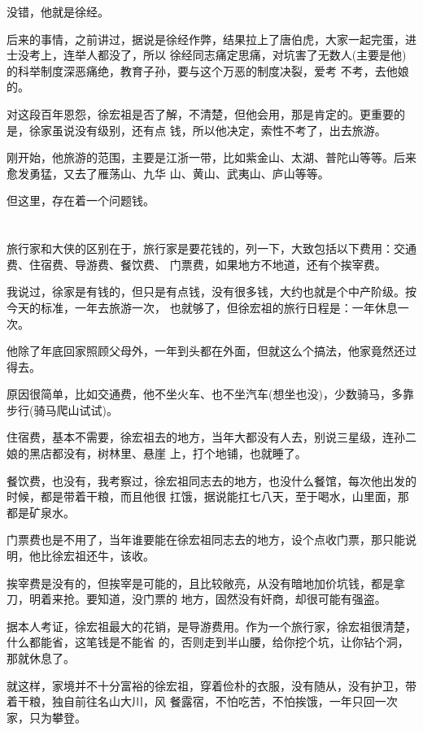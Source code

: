 \documentclass[11pt,a4paper,onecolumn]{article}
\begin{document}
没错，他就是徐经。

后来的事情，之前讲过，据说是徐经作弊，结果拉上了唐伯虎，大家一起完蛋，进士没考上，连举人都没了，所以
徐经同志痛定思痛，对坑害了无数人(主要是他)的科举制度深恶痛绝，教育子孙，要与这个万恶的制度决裂，爱考
不考，去他娘的。

对这段百年恩怨，徐宏祖是否了解，不清楚，但他会用，那是肯定的。更重要的是，徐家虽说没有级别，还有点
钱，所以他决定，索性不考了，出去旅游。

刚开始，他旅游的范围，主要是江浙一带，比如紫金山、太湖、普陀山等等。后来愈发勇猛，又去了雁荡山、九华
山、黄山、武夷山、庐山等等。

但这里，存在着一个问题\myrule 钱。

\section[\thesection]{}

旅行家和大侠的区别在于，旅行家是要花钱的，列一下，大致包括以下费用：交通费、住宿费、导游费、餐饮费、
门票费，如果地方不地道，还有个挨宰费。

我说过，徐家是有钱的，但只是有点钱，没有很多钱，大约也就是个中产阶级。按今天的标准，一年去旅游一次，
也就够了，但徐宏祖的旅行日程是：一年休息一次。

他除了年底回家照顾父母外，一年到头都在外面，但就这么个搞法，他家竟然还过得去。

原因很简单，比如交通费，他不坐火车、也不坐汽车(想坐也没)，少数骑马，多靠步行(骑马爬山试试)。

住宿费，基本不需要，徐宏祖去的地方，当年大都没有人去，别说三星级，连孙二娘的黑店都没有，树林里、悬崖
上，打个地铺，也就睡了。

餐饮费，也没有，我考察过，徐宏祖同志去的地方，也没什么餐馆，每次他出发的时候，都是带着干粮，而且他很
扛饿，据说能扛七八天，至于喝水，山里面，那都是矿泉水。

门票费也是不用了，当年谁要能在徐宏祖同志去的地方，设个点收门票，那只能说明，他比徐宏祖还牛，该收。

挨宰费是没有的，但挨宰是可能的，且比较敞亮，从没有暗地加价坑钱，都是拿刀，明着来抢。要知道，没门票的
地方，固然没有奸商，却很可能有强盗。

据本人考证，徐宏祖最大的花销，是导游费用。作为一个旅行家，徐宏祖很清楚，什么都能省，这笔钱是不能省
的，否则走到半山腰，给你挖个坑，让你钻个洞，那就休息了。

就这样，家境并不十分富裕的徐宏祖，穿着俭朴的衣服，没有随从，没有护卫，带着干粮，独自前往名山大川，风
餐露宿，不怕吃苦，不怕挨饿，一年只回一次家，只为攀登。
\end{document}
